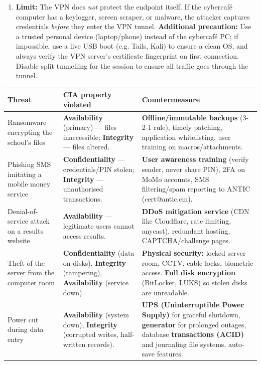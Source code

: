 \documentclass[11pt]{article}
\newcommand{\cle}[1]{{\popxbold\color{popdark}#1}}
\begin{document}
\begin{corrige}
\begin{enumerate}
\item \textbf{Limit:} The VPN does \emph{not} protect the endpoint itself. If the cybercafé computer has a keylogger, screen scraper, or malware, the attacker captures credentials \emph{before} they enter the VPN tunnel.
\textbf{Additional precaution:} Use a trusted personal device (laptop/phone) instead of the cybercafé PC; if impossible, use a live USB boot (e.g. Tails, Kali) to ensure a clean OS, and always verify the VPN server's certificate fingerprint on first connection. Disable \cle{split tunnelling} for the session to ensure all traffic goes through the tunnel.
\end{enumerate}
\end{corrige}

\begin{corrige}
\begin{center}
\begin{tabularx}{\linewidth}{|l|X|X|}
\hline
\rowcolor{popblueL} \textbf{Threat} & \textbf{CIA property violated} & \textbf{Countermeasure} \\
\hline
Ransomware encrypting the school's files & \textbf{Availability} (primary) — files inaccessible; \textbf{Integrity} — files altered. & \textbf{Offline/immutable backups} (3-2-1 rule), timely patching, application whitelisting, user training on macros/attachments. \\
\hline
Phishing SMS imitating a mobile money service & \textbf{Confidentiality} — credentials/PIN stolen; \textbf{Integrity} — unauthorised transactions. & \textbf{User awareness training} (verify sender, never share PIN), 2FA on MoMo accounts, SMS filtering/spam reporting to ANTIC (cert@antic.cm). \\
\hline
Denial-of-service attack on a results website & \textbf{Availability} — legitimate users cannot access results. & \textbf{DDoS mitigation service} (CDN like Cloudflare, rate limiting, anycast), redundant hosting, CAPTCHA/challenge pages. \\
\hline
Theft of the server from the computer room & \textbf{Confidentiality} (data on disks), \textbf{Integrity} (tampering), \textbf{Availability} (service down). & \textbf{Physical security:} locked server room, CCTV, cable locks, biometric access. \textbf{Full disk encryption} (BitLocker, LUKS) so stolen disks are unreadable. \\
\hline
Power cut during data entry & \textbf{Availability} (system down), \textbf{Integrity} (corrupted writes, half-written records). & \textbf{UPS (Uninterruptible Power Supply)} for graceful shutdown, \textbf{generator} for prolonged outages, database \textbf{transactions (ACID)} and journaling file systems, auto-save features. \\

\end{tabularx}
\end{center}
\end{corrige}
\end{document}
